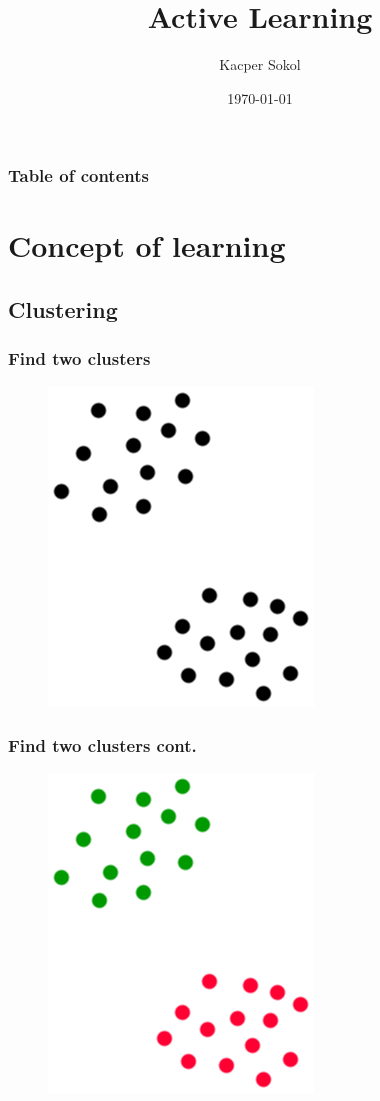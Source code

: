 \documentclass{beamer}
\begin{document}
\title{Active Learning}  
\author{Kacper Sokol}
\date{\today} 
\begin{frame}
\titlepage
\end{frame}




\begin{frame}
  \frametitle{Table of contents}
  \tableofcontents
\end{frame} 


\section{Concept of learning} 
  \subsection{Clustering}
  \begin{frame}
    \frametitle{Find two clusters} 
    \begin{figure}
      \includegraphics[scale=.5]{graphics/presentation/clusters1} 
    \end{figure}
  \end{frame}

  \begin{frame}
    \frametitle{Find two clusters cont.} 
    \begin{figure}
      \includegraphics[scale=.5]{graphics/presentation/clusters1a} 
    \end{figure}
  \end{frame}
\end{document}
